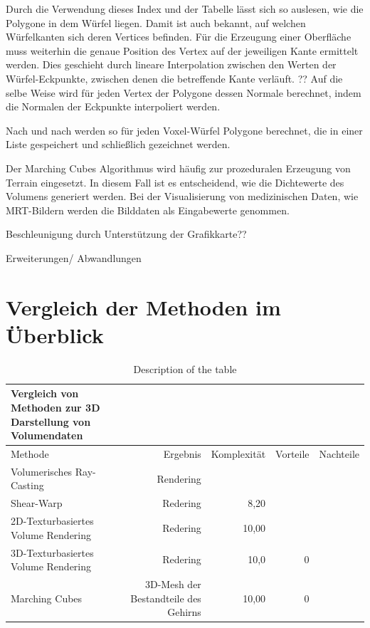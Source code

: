 Durch die Verwendung dieses Index und der Tabelle lässt sich so auslesen, wie die Polygone in dem Würfel liegen. Damit ist auch bekannt, auf welchen Würfelkanten sich deren Vertices befinden. Für die Erzeugung einer Oberfläche muss weiterhin die genaue Position des Vertex auf der jeweiligen Kante ermittelt werden. Dies geschieht durch lineare Interpolation zwischen den Werten der Würfel-Eckpunkte, zwischen denen die betreffende Kante verläuft. ??
Auf die selbe Weise wird für jeden Vertex der Polygone dessen Normale berechnet, indem die Normalen der Eckpunkte interpoliert werden.

Nach und nach werden so für jeden Voxel-Würfel Polygone berechnet, die in einer Liste gespeichert und schließlich gezeichnet werden.

Der Marching Cubes Algorithmus wird häufig zur prozeduralen Erzeugung von Terrain eingesetzt. In diesem Fall ist es entscheidend, wie die Dichtewerte des Volumens generiert werden. Bei der Visualisierung von medizinischen Daten, wie MRT-Bildern werden die Bilddaten als Eingabewerte genommen.

\cite{Lorensen87}

Beschleunigung durch Unterstützung der Grafikkarte??

Erweiterungen/ Abwandlungen


\section{Vergleich der Methoden im Überblick}											 %
\begin{table}
\centering
\begin{tabular}{lrrrr}
\toprule
Vergleich von Methoden zur 3D Darstellung von Volumendaten\\  
\midrule 
Methode & Ergebnis & Komplexität & Vorteile & Nachteile \\ 
\midrule 
Volumerisches Ray-Casting & Rendering &  & & \\
Shear-Warp & Redering & 8,20 & & \\
2D-Texturbasiertes Volume Rendering & Redering  & 10,00 & & \\ 
3D-Texturbasiertes Volume Rendering & Redering  & 10,0 & 0 &\\ 
Marching Cubes & 3D-Mesh der Bestandteile des Gehirns  & 10,00 & 0 &\\ 
\bottomrule
\end{tabular}
\caption{Description of the table}\label{volumeRenderingVergleich}
\end{table}

